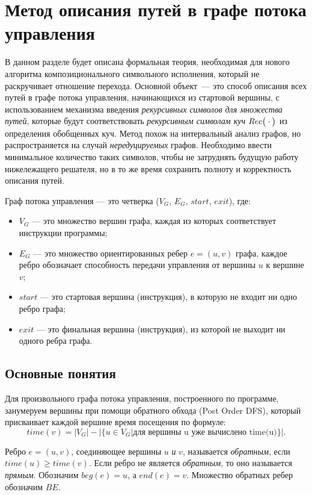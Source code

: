 \section{Метод описания путей в графе потока управления}
\label{section:method}
В данном разделе будет описана формальная теория, необходимая для нового алгоритма композиционального символьного исполнения, который не раскручивает отношение перехода. Основной объект~--- это способ описания всех путей в графе потока управления, начинающихся из стартовой вершины, с использованием механизма введения \emph{рекурсивных символов для множества путей}, которые будут соответствовать \emph{рекурсивным символам куч} $Rec\big(\cdot\big)$ из определения обобщенных куч. Метод похож на интервальный анализ графов, но распространяется на случай \emph{нередуцируемых} графов.
Необходимо ввести минимальное количество таких символов, чтобы не затруднять будущую работу нижележащего решателя, но в то же время сохранить полноту и корректность описания путей.

\begin{defn}
Граф потока управления --- это четверка ($V_G$, $E_G$, $start$, $exit$), где:
\begin{itemize}
    \item $V_G$ --- это множество вершин графа, каждая из которых соответствует инструкции программы;
    \item $E_G$ --- это множество ориентированных ребер $e = (u, v)$ графа, каждое ребро обозначает способность передачи управления от вершины $u$ к вершине $v$;
    \item $start$ --- это стартовая вершина (инструкция), в которую не входит ни одно ребро графа;
    \item $exit$ --- это финальная вершина (инструкция), из которой не выходит ни одного ребра графа.
\end{itemize}
\end{defn}

\subsection{Основные понятия}
Для произвольного графа потока управления, построенного по программе,
занумеруем вершины при помощи обратного обхода (Post Order DFS), который присваивает каждой вершине время посещения по формуле:
$$time(v) = |V_G| - |\{u \in V_G| \mbox{для вершины u уже вычислено time(u)}\}|.$$

\begin{defn}\label{backEdges}
Ребро $e = (u,v)$, соединяющее вершины $u$ \emph{и} $v$, называется \emph{обратным}, если $time(u) \geq time(v)$. 
Если ребро не является \emph{обратным}, то оно называется \emph{прямым}.
Обозначим $beg(e) = u$, а $end(e) = v$.
Множество обратных ребер обозначим $BE$.
\end{defn}

